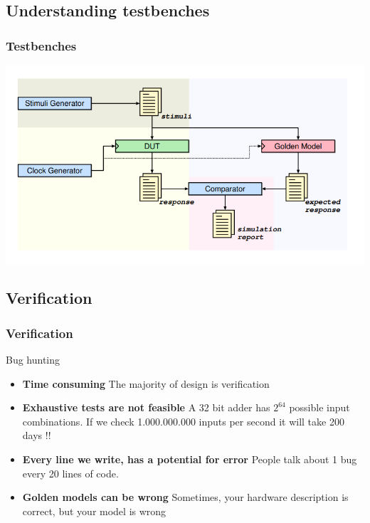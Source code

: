 \documentclass[compress]{beamer}
\begin{document}
\subsection[Testb.]{Understanding testbenches}
\begin{frame}
	\frametitle{Testbenches}
	\begin{center}
		\includegraphics[width=\textwidth]{testb}
	\end{center}
\end{frame}
\subsection[Ver.]{Verification}
\begin{frame}
	\frametitle{Verification}
		\begin{block}{Bug hunting}
		\begin{itemize}
			\item \textbf {Time consuming} \newline
			The majority of design is verification
			\item \textbf {Exhaustive tests are not feasible} \newline
			A 32 bit adder has $2^{64}$ possible input combinations. If we
			check 1.000.000.000 inputs per second it will take 200 days !!
			\item \textbf {Every line we write, has a potential for error} \newline
			People talk about 1 bug every 20 lines of code.
			\item \textbf {Golden models can be wrong} \newline
			Sometimes, your hardware description is correct, but your
			model is wrong	
		\end{itemize}
	\end{block}
\end{frame}
\end{document}
